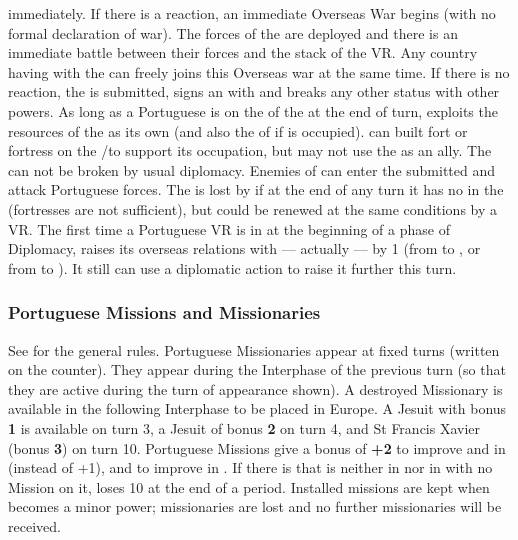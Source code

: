 immediately.
\bparag If there is a reaction, an immediate Overseas War begins (with
no formal declaration of war). The forces of the \MIN are deployed and
there is an immediate battle between their forces and the stack of the
VR. Any country having \dipAT with the \MIN can freely joins this
Overseas war at the same time.
\bparag If there is no reaction, the \MIN is submitted, signs an \dipAT
with \POR and breaks any other status with other powers.  As long as a
Portuguese \LD is on the \COL of the \MIN at the end of turn, \POR
exploits the resources of the \COL as its own (and also the \TP of
 if  is occupied). \POR can built fort or
fortress on the \COL/\TP to support its occupation, but may not use the
\MIN as an ally. The \dipAT can not be broken by usual diplomacy.
\bparag Enemies of \POR can enter the submitted \MIN and attack
Portuguese forces. The \dipAT is lost by \POR if at the end of any turn
it has no \LD in the \COL (fortresses are not sufficient), but could be
renewed at the same conditions by a VR.
\bparag The first time a Portuguese VR is in  at the
beginning of a phase of Diplomacy, \POR raises its overseas relations
with  --- actually  --- by 1 (from \dipNR to \dipFR,
or from \dipFR to \dipAT). It still can use a diplomatic action to raise
it further this turn.

\subsubsection{Portuguese Missions and Missionaries}
\aparag See  for the general rules.
\aparag Portuguese Missionaries appear at fixed turns (written on the
counter). They appear during the Interphase of the previous turn (so
that they are active during the turn of appearance shown).
\bparag A destroyed Missionary is available in the following Interphase
to be placed in Europe.
\bparag A Jesuit with bonus {\bf 1} is available on turn 3, a Jesuit of
bonus {\bf 2} on turn 4, and St Francis Xavier (bonus {\bf 3}) on turn
10.
\aparag Portuguese Missions give a bonus of {\bf +2} to improve \TP and
\COL in  (instead of +1), and to improve \COL in
.
\aparag If there is \COL that is neither in  nor in
 with no Mission on it, \POR loses 10 \PV at
the end of a period.
\aparag Installed missions are kept when  becomes a minor
power; missionaries are lost and no further missionaries will be
received.


